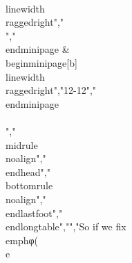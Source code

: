 {{{{{{{{{{{\\linewidth}\\raggedright","\\[A\\zeta(t) + \\frac{1}{\\frac{\\partial\\varphi}{\\partial t}} \\cdot \\frac{\\partial}{\\partial t}\\frac{\\zeta^{'}(t)}{\\frac{\\partial\\varphi}{\\partial t}} = 0\\]","\\end{minipage} & \\begin{minipage}[b]{\\linewidth}\\raggedright","12-12","\\end{minipage} \\\\","\\midrule\\noalign{}","\\endhead","\\bottomrule\\noalign{}","\\endlastfoot","\\end{longtable}","","So if we fix \\emph{φ}(\\e}}}}}}}}}}
